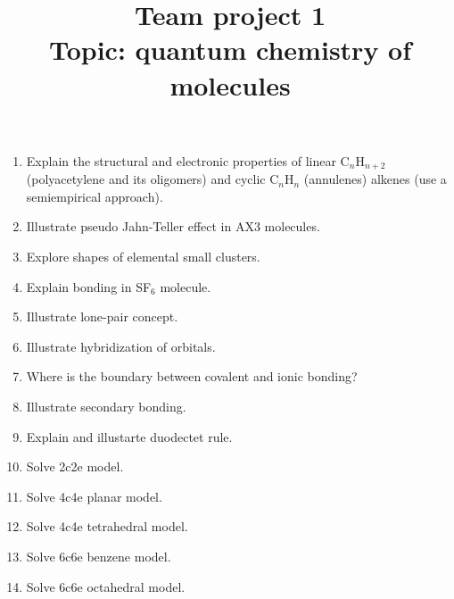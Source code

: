 \documentclass{Project}
\begin{document}
\title{Team project 1 \\ Topic: quantum chemistry of molecules}
\maketitle

\preface{}

\begin{enumerate}
\item Explain the structural and electronic properties of linear C$_n$H$_{n+2}$ (polyacetylene and its oligomers) and cyclic C$_n$H$_n$ (annulenes) alkenes (use a semiempirical approach).
\item Illustrate pseudo Jahn-Teller effect in AX3 molecules.
\item Explore shapes of elemental small clusters.
\item Explain bonding in SF$_6$ molecule.
\item Illustrate lone-pair concept.
\item Illustrate hybridization of orbitals.
\item Where is the boundary between covalent and ionic bonding?
\item Illustrate secondary bonding.
\item Explain and illustarte duodectet rule.
\item Solve 2c2e model.
\item Solve 4c4e planar model.
\item Solve 4c4e tetrahedral model.
\item Solve 6c6e benzene model.
\item Solve 6c6e octahedral model.
\end{enumerate}

\reminder{}
\end{document}
